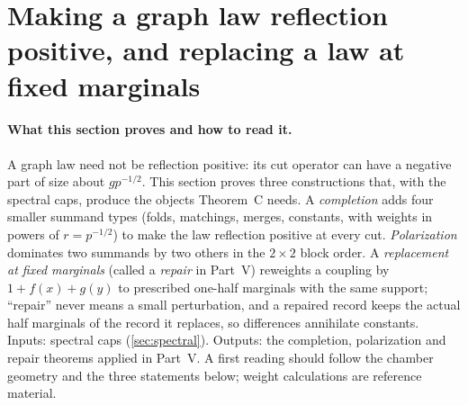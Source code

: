 \section{Making a graph law reflection positive, and replacing a law at fixed marginals}\label{sec:completion-repair}

\paragraph{What this section proves and how to read it.}
A graph law need not be reflection positive: its cut operator can have a
negative part of size about $gp^{-1/2}$. This section proves three
constructions that, with the spectral caps, produce the objects
Theorem~C needs. A \emph{completion} adds four smaller summand
types (folds, matchings, merges, constants, with weights in powers
of $r=p^{-1/2}$) to make the law reflection positive at every cut.
\emph{Polarization} dominates two summands by two others in the
$2\times2$ block order. A \emph{replacement at fixed marginals}
(called a \emph{repair} in Part~V) reweights a coupling by
$1+f(x)+g(y)$ to prescribed one-half marginals with the same
support; ``repair'' never means a small perturbation, and a
repaired record keeps the actual half marginals of the record it
replaces, so differences annihilate constants. Inputs: spectral
caps (\cref{sec:spectral}). Outputs: the completion, polarization
and repair theorems applied in Part~V. A first reading should
follow the chamber geometry and the three statements below; weight
calculations are reference material.

